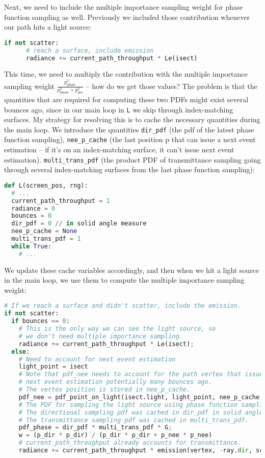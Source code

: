 Next, we need to include the multiple importance sampling weight for phase function sampling as well. Previously we included those contribution whenever our path hits a light source:
\begin{lstlisting}[language=python]
    if not scatter:
      # reach a surface, include emission
      radiance += current_path_throughput * Le(isect)
\end{lstlisting}

This time, we need to multiply the contribution with the multiple importance sampling weight $\frac{p_{\text{phase}}^2}{p_{\text{phase}}^2 + p_{\text{nee}}^2}$ -- how do we get those values? The problem is that the quantities that are required for computing these two PDFs might exist several bounces ago, since in our main loop in \lstinline{L} we skip through index-matching surfaces. My strategy for resolving this is to cache the necessary quantities during the main loop. We introduce the quantities \lstinline{dir_pdf} (the pdf of the latest phase function sampling), \lstinline{nee_p_cache} (the last position p that can issue a next event estimation -- if it's on an index-matching surface, it can't issue next event estimation). \lstinline{multi_trans_pdf} (the product PDF of transmittance sampling going through several index-matching surfaces from the last phase function sampling):
\begin{lstlisting}[language=python]
def L(screen_pos, rng):
  # ...
  current_path_throughput = 1
  radiance = 0
  bounces = 0
  dir_pdf = 0 // in solid angle measure
  nee_p_cache = None
  multi_trans_pdf = 1
  while True:
    # ...
\end{lstlisting}

We update these cache variables accordingly, and then when we hit a light source in the main loop, we use them to
compute the multiple importance sampling weight:
\begin{lstlisting}[language=python]
# If we reach a surface and didn't scatter, include the emission.
if not scatter:
  if bounces == 0:
    # This is the only way we can see the light source, so
    # we don't need multiple importance sampling.
    radiance += current_path_throughput * Le(isect);
  else:
    # Need to account for next event estimation
    light_point = isect
    # Note that pdf_nee needs to account for the path vertex that issued
    # next event estimation potentially many bounces ago.
    # The vertex position is stored in nee_p_cache.
    pdf_nee = pdf_point_on_light(isect.light, light_point, nee_p_cache, scene)
    # The PDF for sampling the light source using phase function sampling + transmittance sampling
    # The directional sampling pdf was cached in dir_pdf in solid angle measure.
    # The transmittance sampling pdf was cached in multi_trans_pdf.
    pdf_phase = dir_pdf * multi_trans_pdf * G;
    w = (p_dir * p_dir) / (p_dir * p_dir + p_nee * p_nee)
    # current_path_throughput already accounts for transmittance.
    radiance += current_path_throughput * emission(vertex, -ray.dir, scene) * w
\end{lstlisting}

